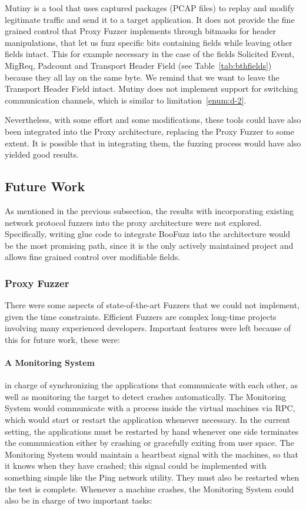 Mutiny is a tool that uses captured packages (PCAP files) to replay and modify legitimate traffic and send it to a target application.
It does not provide the fine grained control that Proxy Fuzzer implements through bitmasks for header manipulations, that let us fuzz
specific bits containing fields while leaving other fields intact. This for example necessary in the case of the fields Solicited Event,
MigReq, Padcount and Transport Header Field (see Table~\ref{tab:bthfields}) because they all lay on the same byte. We remind that we want to
leave the Transport Header Field intact. Mutiny does
not implement support for switching communication channels, which is similar to limitation~\ref{enum:d-2}.

Nevertheless, with some effort and some modifications, these tools could have also been integrated
into the Proxy architecture, replacing the Proxy Fuzzer to some extent. It is possible that in integrating them,
the fuzzing process would have also yielded good results.


\subsection{Future Work}

As mentioned in the previous subsection, the results with incorporating
existing network protocol fuzzers into the proxy architecture were
not explored. Specifically, writing glue code to integrate BooFuzz into the architecture would
be the most promising path, since it is the only actively maintained project and allows fine grained control over modifiable fields.


\subsubsection{Proxy Fuzzer}

There were some aspects of state-of-the-art Fuzzers that we could not implement, given the time constraints.
Efficient Fuzzers are complex long-time projects involving many experienced developers. Important features were left
because of this for future work, these were:

\paragraph{A Monitoring System} in charge of synchronizing the applications that communicate with each other,
as well as monitoring the target to detect crashes automatically. The Monitoring System would communicate
with a process inside the virtual machines via RPC, which would start or restart the application whenever necessary.
In the current setting, the applications must be restarted by hand whenever one side terminates the communication either by crashing
or gracefully exiting from user space. The Monitoring System would maintain a heartbeat signal with the machines, so that it knows when they have
crashed; this signal could be implemented with something simple like the Ping network utility.
They must also be restarted when the test is complete. Whenever a machine crashes, the Monitoring
System could also be in charge of two important tasks:

